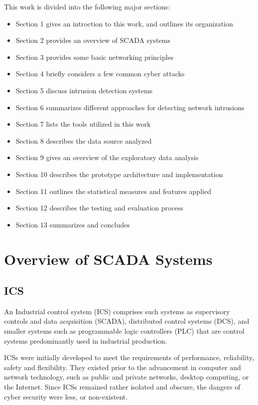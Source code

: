 \documentclass[12pt,]{article}
\begin{document}
This work is divided into the following major sections:

\begin{itemize}
\itemsep1pt\parskip0pt
\item
  Section 1 gives an introction to this work, and outlines its
  organization
\item
  Section 2 provides an overview of SCADA systems
\item
  Section 3 provides some basic networking principles
\item
  Section 4 briefly considers a few common cyber attacks
\item
  Section 5 discuss intrusion detection systems
\item
  Section 6 summarizes different approaches for detecting network
  intrusions
\item
  Section 7 lists the tools utilized in this work
\item
  Section 8 describes the data source analyzed
\item
  Section 9 gives an overview of the exploratory data analysis
\item
  Section 10 describes the prototype architecture and implementation
\item
  Section 11 outlines the statistical measures and features applied
\item
  Section 12 describes the testing and evaluation process
\item
  Section 13 summarizes and concludes
\end{itemize}

\pagebreak

\section{Overview of SCADA Systems}\label{overview-of-scada-systems}

\subsection{ICS}\label{ics}

An Industrial control system (ICS) comprises such systems as supervisory
controls and data acquisition (SCADA), distributed control systems
(DCS), and smaller systems such as programmable logic controllers (PLC)
that are control systems predominantly used in industrial production.

ICSs were initially developed to meet the requirements of performance,
reliability, safety and flexibility. They existed prior to the
advancement in computer and network technology, such as public and
private networks, desktop computing, or the Internet. Since ICSs
remained rather isolated and obscure, the dangers of cyber security were
less, or non-existent.
\end{document}
